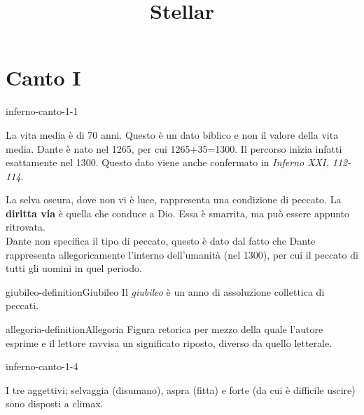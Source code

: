 \documentclass[preview]{standalone}
\begin{document}
\title{Stellar}
\genpage

\section{Canto I}


\begin{snippet}{inferno-canto-1-1}

    La vita media è di 70 anni. Questo è un dato biblico e non il valore della vita media.
    Dante è nato nel 1265, per cui 1265+35=1300. Il percorso inizia infatti esattamente nel 1300.
    Questo dato viene anche confermato in \textit{Inferno XXI, 112-114}.

    La selva oscura, dove non vi è luce, rappresenta una condizione di peccato.
    La \textbf{diritta via} è quella che conduce a Dio.
    Essa è smarrita, ma può essere appunto ritrovata.
    \\
    Dante non specifica il tipo di peccato, questo è dato dal fatto che Dante rappresenta allegoricamente
    l'interno dell'umanità (nel 1300), per cui il peccato di tutti gli uomini in quel periodo.
\end{snippet}

\begin{snippetdefinition}{giubileo-definition}{Giubileo}
    Il \textit{giubileo} è un anno di assoluzione collettica di peccati.
\end{snippetdefinition}


\begin{snippetdefinition}{allegoria-definition}{Allegoria}
    Figura retorica per mezzo della quale l'autore esprime e il lettore ravvisa un significato riposto,
    diverso da quello letterale.
\end{snippetdefinition}

\begin{snippet}{inferno-canto-1-4}

    I tre aggettivi; selvaggia (disumano), aspra (fitta) e forte (da cui è difficile uscire)
    sono disposti a climax.
\end{snippet}
\end{document}
